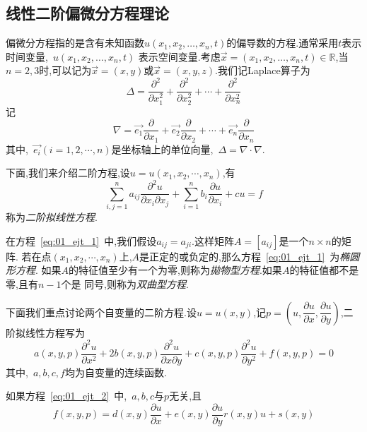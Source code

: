 \documentclass[a4paper,cs4size,adobefonts,fancyhdr]{ctexart}[2005/11/25]
\newcommand{\upcite}[1]{\textsuperscript{\textsuperscript{\cite{#1}}}}
\begin{document}
\subsection{线性二阶偏微分方程理论}
偏微分方程指的是含有未知函数$u(x_1,x_2,\ldots,x_n,t)$的偏导数的方程\upcite{SHUXUEWULI}.通常采用$t$表示时间变量,~$u(x_1,x_2,\ldots,x_n,t)$
表示空间变量.考虑$\vec{x}=(x_1,x_2,\ldots,x_n,t)\in \mathbb{R}$,当$n=2,3$时,可以记为$\vec{x}=(x,y)$或$\vec{x}=
(x,y,z)$.我们记Laplace算子为
\begin{equation*}
 \Delta = \dfrac{\partial^2}{\partial x_1^2}+\dfrac{\partial^2}{\partial x_2^2}+\cdots +  \dfrac{\partial^2}{\partial x_n^2}
\end{equation*}
记
\begin{equation*}
 \nabla = \vec{e_1}\dfrac{\partial}{\partial x_1}+\vec{e_2}\dfrac{\partial}{\partial x_2}
	  +\cdots + \vec{e_n}\dfrac{\partial}{\partial x_n}
\end{equation*}
其中,~$\vec{e_i}(i=1,2,\cdots,n)$是坐标轴上的单位向量,~$\Delta=\nabla\cdot\nabla$.\par
下面,我们来介绍二阶方程,设$u=u(x_1,x_2,\cdots,x_n)$,有
\begin{equation}\label{eq:01_ejt_1}
 \sum_{i,j=1}^{n}a_{ij}\dfrac{\partial^2 u}{\partial x_i \partial x_j}
 +\sum_{i=1}^{n} b_i\dfrac{\partial u}{\partial x_i} + cu=f
\end{equation}
称为\emph{二阶拟线性方程}.\par
在方程~\eqref{eq:01_ejt_1}~中,我们假设$a_{ij}=a_{ji}$.这样矩阵$A=[a_{ij}]$是一个$n\times n$的矩阵.
若在点$(x_1,x_2,\cdots,x_n)$上,$A$是正定的或负定的,那么方程~\eqref{eq:01_ejt_1}~为\emph{椭圆形方程}.
如果$A$的特征值至少有一个为零,则称为\emph{拋物型方程}.如果$A$的特征值都不是零,且有$n-1$个是
同号,则称为\emph{双曲型方程}.\par
下面我们重点讨论两个自变量的二阶方程.设$u=u(x,y)$,记$p=\left(u,\dfrac{\partial u}{\partial x},
\dfrac{\partial u}{\partial y}\right)$,二阶拟线性方程写为
\begin{equation}\label{eq:01_ejt_2}
 a(x,y,p)\dfrac{\partial^2 u}{\partial x^2}+2b(x,y,p)\dfrac{\partial^2 u}{\partial x\partial y}
 +c(x,y,p)\dfrac{\partial^2 u}{\partial y^2}+f(x,y,p)=0
\end{equation}
其中,~$a,b,c,f$均为自变量的连续函数.\par
如果方程~\eqref{eq:01_ejt_2}~中,~$a,b,c$与$p$无关,且
\begin{equation}
 f(x,y,p)=d(x,y)\dfrac{\partial u}{\partial x}+e(x,y)\dfrac{\partial u}{\partial y}
	  r(x,y)u+s(x,y)
\end{equation}
\end{document}
